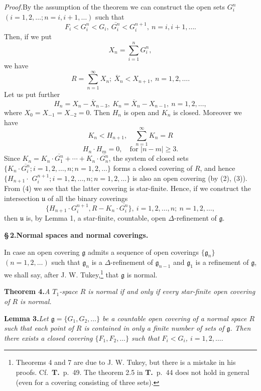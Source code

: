 \documentclass[11pt,a4paper,leqno]{article}
\newcommand{\g}{\mathfrak g}
\newcommand{\thm}[2]{\par\medskip\textbf{Theorem #1.}\quad\textit{#2}\par}
\newcommand{\lem}[2]{\par\medskip\textbf{Lemma #1.}\quad\textit{#2}\par}
\newcommand{\proof}{\textit{Proof.}\quad}
\newcommand{\sect}[2]{\par\medskip\begin{center}\bfseries\S\,#1.\quad #2\end{center}}
\begin{document}
\proof By the assumption of the theorem we can construct the open sets $G_i^n$ $(i=1,2,\ldots;n=i,i+1,\ldots)$ such that
\begin{equation}\tag{2}
F_i<G_i^n<G_i,\ \overline{G_i^n}<G_i^{n+1},\ n=i,i+1,\ldots.
\end{equation}
Then, if we put
\[
X_n=\sum_{i=1}^n G_i^n,
\]
we have
\[
R=\sum_{n=1}^{\infty}X_n;\ \overline X_n<X_{n+1},\ n=1,2,\ldots.
\]
Let us put further
\[
H_n=X_n-\overline X_{n-3},\ K_n=\overline X_n-X_{n-1},\ n=1,2,\ldots,
\]
where $X_0=X_{-1}=X_{-2}=0$. Then $H_n$ is open and $K_n$ is closed. Moreover we have
\begin{equation}\tag{3}
K_n<H_{n+1},\quad\sum_{n=1}^{\infty}K_n=R
\end{equation}
\begin{equation}\tag{4}
H_n\cdot H_m=0,\quad\text{for }|n-m|\geq3.
\end{equation}
Since $K_n=K_n\cdot\overline{G_1^n}+\cdots+K_n\cdot\overline{G_n^n}$, the system of closed sets $\{K_n\cdot\overline{G_i^n};i=1,2,\ldots,n;n=1,2,\ldots\}$ forms a closed covering of $R$, and hence $\{H_{n+1}\cdot{}$
\newpage
\noindent $G_i^{n+1};i=1,2,\ldots,n;n=1,2,\ldots\}$ is also an open covering (by (2), (3)). From (4) we see that the latter covering is star-finite. Hence, if we construct the intersection $\mathfrak u$ of all the binary coverings
\[
\{H_{n+1}\cdot G_i^{n+1},R-K_n\cdot\overline{G_i^n}\},\ i=1,2,\ldots,n;\ n=1,2,\ldots,
\]
then $\mathfrak u$ is, by Lemma 1, a star-finite, countable, open $\Delta$-refinement of $\g$.

\sect{2}{Normal spaces and normal coverings.}
In case an open covering $\g$ admits a sequence of open coverings $\{\g_n\}$ $(n=1,2,\ldots)$ such that $\g_n$ is a $\Delta$-refinement of $\g_{n-1}$ and $\g_1$ is a refinement of $\g$, we shall say, after J. W. Tukey,\footnote{Theorems 4 and 7 are due to J. W. Tukey, but there is a mistake in his proofs. Cf.\ \textbf{T.}\ p.\ 49. The theorem 2.5 in \textbf{T.}\ p.\ 44 does not hold in general (even for a covering consisting of three sets).} that $\g$ is normal.

\thm{4}{A $T_1$-space $R$ is normal if and only if every star-finite open covering of $R$ is normal.}

\lem{3}{Let $\g=\{G_1,G_2,\ldots\}$ be a countable open covering of a normal space $R$ such that each point of $R$ is contained in only a finite number of sets of $\g$. Then there exists a closed covering $\{F_1,F_2,\ldots\}$ such that $F_i<G_i$, $i=1,2,\ldots$.}
\end{document}
